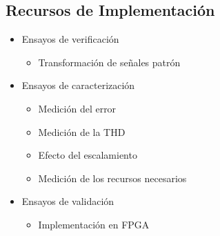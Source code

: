 \subsection{Recursos de Implementación}

\begin{frame}{}
  \Fontit
  \begin{itemize}
    \item<1-> Ensayos de verificación
    \begin{itemize}
      \Fontitit
      \item<1-> Transformación de señales patrón
    \end{itemize}
    \item<1-> Ensayos de caracterización
    \begin{itemize}
      \Fontitit
      \item<1-> Medición del error
      \item<1-> Medición de la THD
      \item<1-> Efecto del escalamiento
      \item<1-> Medición de los recursos necesarios 
    \end{itemize}
    \item<1-> Ensayos de validación
    \begin{itemize}
      \Fontitit
      \item<1-> Implementación en FPGA
    \end{itemize}
  \end{itemize}
\end{frame}

